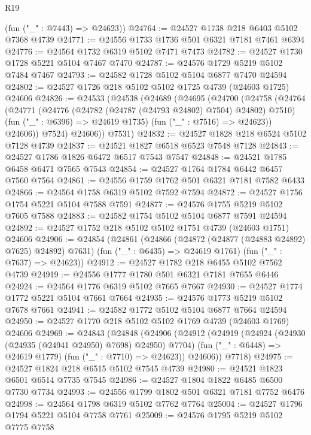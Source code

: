 \begin{lexlean}{R19}
\begin{coremodule}
{{{{{{{{{{{      (fun ("_" : @7443) => @24623))
@24764 := @24527 @1738 @218 @6403 @5102 @7368 @4739
@24771 := @24556 @1733 @1736 @501 @6321 @7181 @7461 @6394
@24776 := @24564 @1732 @6319 @5102 @7471 @7473
@24782 := @24527 @1730 @1728 @5221 @5104 @7467 @7470
@24787 := @24576 @1729 @5219 @5102 @7484 @7467
@24793 := @24582 @1728 @5102 @5104 @6877 @7470 @24594
@24802 := @24527 @1726 @218 @5102 @5102 @1725 @4739 (@24603 @1725) @24606
@24826 := @24533
    (@24538
      (@24689
        (@24695
          (@24700
            (@24758
              (@24764
                (@24771
                  (@24776 (@24782 (@24787 (@24793 @24802) @7504) @24802) @7510)
                  (fun ("_" : @6396) => @24619 @1735)
                  (fun ("_" : @7516) => @24623))
                @24606))
            @7524)
          @24606))
      @7531)
@24832 := @24527 @1828 @218 @6524 @5102 @7128 @4739
@24837 := @24521 @1827 @6518 @6523 @7548 @7128
@24843 := @24527 @1786 @1826 @6472 @6517 @7543 @7547
@24848 := @24521 @1785 @6458 @6471 @7565 @7543
@24854 := @24527 @1764 @1784 @6442 @6457 @7560 @7564
@24861 := @24556 @1759 @1762 @501 @6321 @7181 @7582 @6433
@24866 := @24564 @1758 @6319 @5102 @7592 @7594
@24872 := @24527 @1756 @1754 @5221 @5104 @7588 @7591
@24877 := @24576 @1755 @5219 @5102 @7605 @7588
@24883 := @24582 @1754 @5102 @5104 @6877 @7591 @24594
@24892 := @24527 @1752 @218 @5102 @5102 @1751 @4739 (@24603 @1751) @24606
@24906 := @24854
    (@24861
      (@24866 (@24872 (@24877 (@24883 @24892) @7625) @24892) @7631)
      (fun ("_" : @6435) => @24619 @1761)
      (fun ("_" : @7637) => @24623))
@24912 := @24527 @1782 @218 @6455 @5102 @7562 @4739
@24919 := @24556 @1777 @1780 @501 @6321 @7181 @7655 @6446
@24924 := @24564 @1776 @6319 @5102 @7665 @7667
@24930 := @24527 @1774 @1772 @5221 @5104 @7661 @7664
@24935 := @24576 @1773 @5219 @5102 @7678 @7661
@24941 := @24582 @1772 @5102 @5104 @6877 @7664 @24594
@24950 := @24527 @1770 @218 @5102 @5102 @1769 @4739 (@24603 @1769) @24606
@24969 := @24843
    (@24848
      (@24906
        (@24912
          (@24919
            (@24924 (@24930 (@24935 (@24941 @24950) @7698) @24950) @7704)
            (fun ("_" : @6448) => @24619 @1779)
            (fun ("_" : @7710) => @24623))
          @24606))
      @7718)
@24975 := @24527 @1824 @218 @6515 @5102 @7545 @4739
@24980 := @24521 @1823 @6501 @6514 @7735 @7545
@24986 := @24527 @1804 @1822 @6485 @6500 @7730 @7734
@24993 := @24556 @1799 @1802 @501 @6321 @7181 @7752 @6476
@24998 := @24564 @1798 @6319 @5102 @7762 @7764
@25004 := @24527 @1796 @1794 @5221 @5104 @7758 @7761
@25009 := @24576 @1795 @5219 @5102 @7775 @7758
}}}}}}}}}}}
\end{coremodule}
\end{lexlean}
